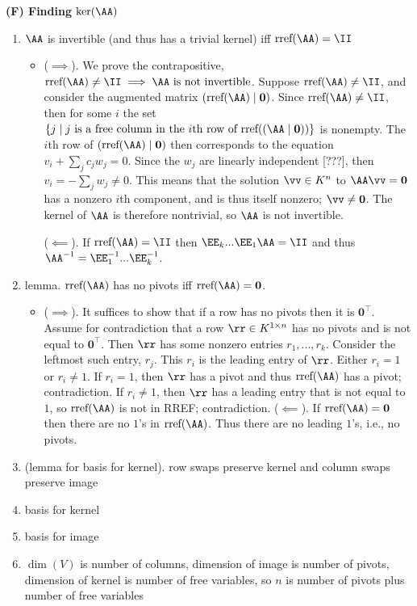 \textbf{(F) Finding $\ker(\AA)$}
\begin{enumerate}    
    \item $\AA$ is invertible (and thus has a trivial kernel) iff $\rref(\AA) = \II$
    \begin{itemize}
        \item    
        ($\implies$). We prove the contrapositive, $\rref(\AA) \neq \II \implies \text{$\AA$ is not invertible}$. Suppose $\rref(\AA) \neq \II$, and consider the augmented matrix $(\rref(\AA) \mid \mathbf{0})$. Since $\rref(\AA) \neq \II$, then for some $i$ the set $\{j \mid \text{$j$ is a free column in the $i$th row of $\rref((\AA \mid \mathbf{0}))$}\}$ is nonempty. The $i$th row of $(\rref(\AA) \mid \mathbf{0})$ then corresponds to the equation $v_i + \sum_j c_j w_j = 0$. Since the $w_j$ are linearly independent [???], then $v_i = -\sum_j w_j \neq 0$. This means that the solution $\vv \in K^n$ to $\AA \vv = \mathbf{0}$ has a nonzero $i$th component, and is thus itself nonzero; $\vv \neq \mathbf{0}$. The kernel of $\AA$ is therefore nontrivial, so $\AA$ is not invertible. 

        ($\impliedby$). If $\rref(\AA) = \II$ then $\EE_k ... \EE_1 \AA = \II$ and thus $\AA^{-1} = \EE_1^{-1} ... \EE_k^{-1}$.
    \end{itemize}
    \item lemma. $\rref(\AA)$ has no pivots iff $\rref(\AA) = \mathbf{0}$.
    \begin{itemize}
        \item ($\implies$). It suffices to show that if a row has no pivots then it is $\mathbf{0}^\top$. Assume for contradiction that a row $\rr \in K^{1 \times n}$ has no pivots and is not equal to $\mathbf{0}^\top$. Then $\rr$ has some nonzero entries $r_1, ..., r_k$. Consider the leftmost such entry, $r_j$. This $r_i$ is the leading entry of $\rr$. Either $r_i = 1$ or $r_i \neq 1$. If $r_i = 1$, then $\rr$ has a pivot and thus $\rref(\AA)$ has a pivot; contradiction. If $r_i \neq 1$, then $\rr$ has a leading entry that is not equal to $1$, so $\rref(\AA)$ is not in RREF; contradiction. 
        ($\impliedby$). If $\rref(\AA) = \mathbf{0}$ then there are no $1$'s in $\rref(\AA)$. Thus there are no leading $1$'s, i.e., no pivots.
    \end{itemize}
    \item (lemma for basis for kernel). row swaps preserve kernel and column swaps preserve image
    \item basis for kernel
    \item basis for image
    \item $\dim(V)$ is number of columns, dimension of image is number of pivots, dimension of kernel is number of free variables, so $n$ is number of pivots plus number of free variables
\end{enumerate}

